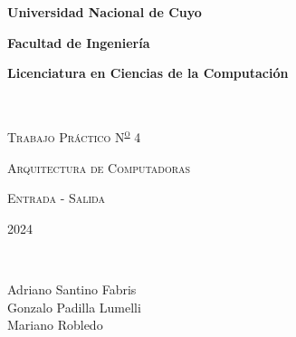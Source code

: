 {\centering
    {\bfseries\Large Universidad Nacional de Cuyo \par}
    \vspace{-0.2cm}
    {\bfseries\Large Facultad de Ingeniería \par}
    \vspace{-0.2cm}
    {\bfseries\Large Licenciatura en Ciencias de la Computación \par}
    \pagestyle{plain}
    \vfill
    \noindent\hrulefill \\
    {\scshape\Huge Trabajo Práctico N\textsuperscript{\Large\underline o} 4\par} %
    \vspace{0.5cm}
    {\scshape\Large Arquitectura de Computadoras \par}
    {\scshape\large Entrada - Salida \par}
    \vspace{0.5cm}
    {\scshape\Large 2024 \par} %
    \noindent\hrulefill \\
    \vspace{4cm}
    {\Large
    Adriano Santino Fabris\\
    Gonzalo Padilla Lumelli\\
    Mariano Robledo
    \par}
    \vfill
    \setcounter{page}{1}
    \newpage
}